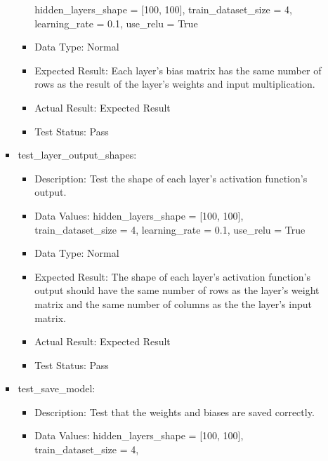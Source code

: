 \documentclass[./project-report/src/latex/project-report.tex]{subfiles}
\begin{document}
\begin{itemize}
\begin{itemize}
\begin{itemize}
\begin{itemize}
							hidden\_layers\_shape = [100, 100], \newline
							train\_dataset\_size = 4, \newline
							learning\_rate = 0.1, \newline
							use\_relu = True \newline
						\item Data Type: Normal
						\item Expected Result: Each layer's bias matrix has the same number of rows as the result of the layer's weights and input multiplication.
						\item Actual Result: Expected Result
						\item Test Status: Pass
					\end{itemize}
					\item test\_layer\_output\_shapes:
					\begin{itemize}
						\item Description: Test the shape of each layer's activation function's output.
						\item Data Values: \newline
							hidden\_layers\_shape = [100, 100], \newline
                         	train\_dataset\_size = 4, \newline
                         	learning\_rate = 0.1, \newline
                         	use\_relu = True
						\item Data Type: Normal
						\item Expected Result: The shape of each layer's activation function's output should have the same number of rows as the layer's weight matrix and the same number of columns as the 
							  the layer's input matrix.
						\item Actual Result: Expected Result
						\item Test Status: Pass
					\end{itemize}
					\item test\_save\_model:
					\begin{itemize}
						\item Description: Test that the weights and biases are saved correctly.
						\item Data Values: \newline
							hidden\_layers\_shape = [100, 100], \newline
                            train\_dataset\_size = 4, \newline

\end{itemize}
\end{itemize}
\end{itemize}
\end{itemize}
\end{document}
